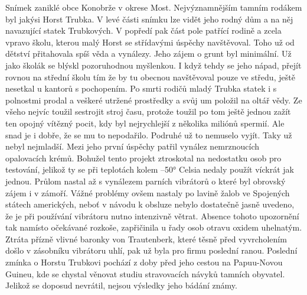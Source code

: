 
Snímek zaniklé obce Konobrže v okrese Most. Nejvýznamnějším tamním
rodákem byl jakýsi Horst Trubka. V levé části snímku lze vidět jeho
rodný dům a na něj navazující statek Trubkových. V popředí pak část
pole patřící rodině a zcela vpravo školu, kterou malý Horst se
střídavými úspěchy navštěvoval. Toho už od dětství přitahovala spíš
věda a vynálezy. Jeho zájem o grunt byl minimální. Už jako školák se
blýskl pozoruhodnou myšlenkou. I když tehdy se jeho nápad, přejít
rovnou na střední školu tím že by tu obecnou navštěvoval pouze ve
středu, ještě nesetkal u kantorů s pochopením. Po smrti rodičů mladý
Trubka statek i s polnostmi prodal a veškeré utržené prostředky a svůj
um položil na oltář vědy. Ze všeho nejvíc toužil sestrojit stroj času,
protože toužil po tom ještě jednou zažít ten opojný vítězný pocit, kdy
byl nejrychlejší z několika miliónů spermií. Ale snad je i dobře, že
se mu to nepodařilo. Podruhé už to nemuselo vyjít. Taky už nebyl
nejmladší. Mezi jeho první úspěchy patřil vynález nemrznoucích
opalovacích krémů. Bohužel tento projekt ztroskotal na nedostatku osob
pro testování, jelikož ty se při teplotách kolem --50° Celsia
nedaly použít víckrát jak jednou. Průlom nastal až s vynálezem parních
vibrátorů o které byl obrovský zájem i v zámoří. Vážné problémy ovšem
nastaly po lavině žalob ve Spojených státech amerických, neboť v
návodu k obsluze nebylo dostatečně jasně uvedeno, že je při používání
vibrátoru nutno intenzivně větrat. Absence tohoto upozornění tak
namísto očekávané rozkoše, zapřičinila u řady osob otravu oxidem
uhelnatým. Ztráta přízně vlivné baronky von Trautenberk, které těsně
před vyvrcholením došlo v zásobníku vibrátoru uhlí, pak už byla pro
firmu poslední ranou. Poslední zmínka o Horstu Trubkovi pochází z doby
před jeho cestou na Papuu-Novou Guineu, kde se chystal věnovat
studiu stravovacích návyků tamních obyvatel. Jelikož se doposud
nevrátil, nejsou výsledky jeho bádání známy.

